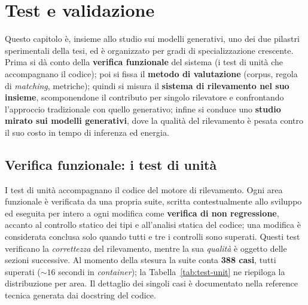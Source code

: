 \chapter{Test e validazione}
\label{cap:test}

Questo capitolo è, insieme allo studio sui modelli generativi, uno dei due pilastri sperimentali della tesi, ed è organizzato per gradi di specializzazione crescente. Prima si dà conto della \textbf{verifica funzionale} del sistema (i test di unità che accompagnano il codice); poi si fissa il \textbf{metodo di valutazione} (corpus, regola di \textit{matching}, metriche); quindi si misura il \textbf{sistema di rilevamento nel suo insieme}, scomponendone il contributo per singolo rilevatore e confrontando l'approccio tradizionale con quello generativo; infine si conduce uno \textbf{studio mirato sui modelli generativi}, dove la qualità del rilevamento è pesata contro il suo costo in tempo di inferenza ed energia.

\section{Verifica funzionale: i test di unità}
\label{sec:test-unit}

I test di unità accompagnano il codice del motore di rilevamento. Ogni area funzionale è verificata da una propria suite, scritta contestualmente allo sviluppo ed eseguita per intero a ogni modifica come \textbf{verifica di non regressione}, accanto al controllo statico dei tipi e all'analisi statica del codice; una modifica è considerata conclusa solo quando tutti e tre i controlli sono superati. Questi test verificano la \emph{correttezza} del rilevamento, mentre la sua \emph{qualità} è oggetto delle sezioni successive. Al momento della stesura la suite conta \textbf{388 casi}, tutti superati (${\sim}16$ secondi in \textit{container}); la Tabella~\ref{tab:test-unit} ne riepiloga la distribuzione per area. Il dettaglio dei singoli casi è documentato nella reference tecnica generata dai docstring del codice.


